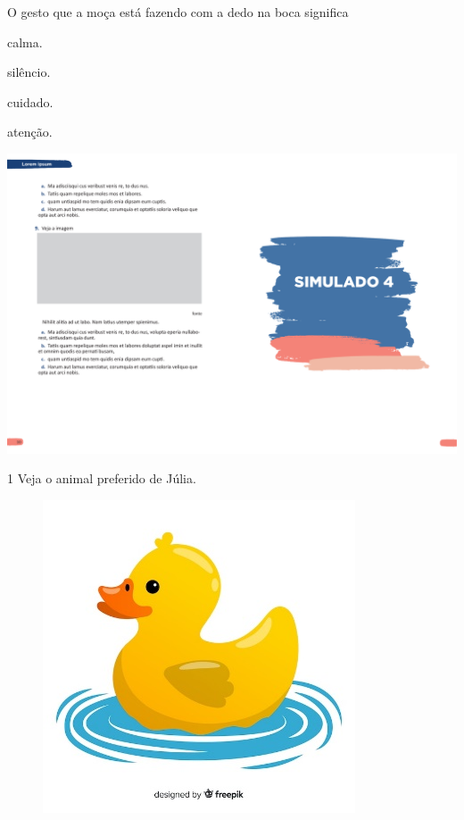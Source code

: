 
O gesto que a moça está fazendo com a dedo na boca significa

\begin{multicols}{2}
\begin{escolha}
\item calma.

\item silêncio.

\item cuidado.

\item atenção.
\end{escolha}
\end{multicols}

\vspace*{-3.4cm}
\hspace*{-3.7cm}\includegraphics[scale=1]{../watermarks/4simulado5ano.pdf}

\num{1} Veja o animal preferido de Júlia.

\begin{figure}[htpb!]
\centering
\includegraphics[width=.5\textwidth]{media/image174.jpeg}
\end{figure}


